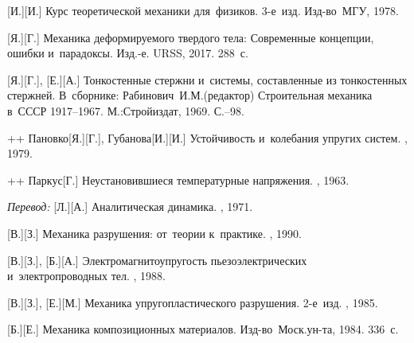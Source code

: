 \begin{thebibliography}{123}
\begin{otherlanguage}{russian}
[И.][И.] Курс теоретической механики для~физиков. 3\hbox{-}е~изд. Изд\hbox{-}во~МГУ, 1978. 

[Я.][Г.] Механика деформируемого твердого тела: Современные концепции, ошибки и~парадоксы. Изд.\hbox{-}е. URSS, 2017. 288~с.

[Я.][Г.], [Е.][А.] Тонкостенные стержни и~системы, составленные из тонкостенных стержней. В~сборнике: Рабинович~И.\:М.\:(редактор) Строительная механика в~СССР 1917\hbox{--}1967. М.:\;Строй\-издат, 1969. С.\hbox{--}98.

++ {Пановко}[Я.][Г.], {Губанова}[И.][И.] Устойчивость и~колебания упругих систем. \naukapublisher, 1979. 

++ {Паркус}[Г.] Неустановившиеся температурные напряжения. \fizmatgiz, 1963. 


\emph{Перевод:} [Л.][А.] Аналитическая динамика. \naukapublisher, 1971. 

[В.][З.] Механика разрушения: от~теории к~практике. \naukapublisher, 1990. 

[В.][З.], [Б.][А.] Электромагнитоупругость пьезоэлектрических и~электропроводных тел. \naukapublisher, 1988. 

[В.][З.], [Е.][М.] Механика упругопластического разрушения. 2\hbox{-}е~изд. \naukapublisher, 1985. 

[Б.][Е.] Механика композиционных материалов. Изд\hbox{-}во~Моск.\:ун\hbox{-}та, 1984. 336~с.


\end{otherlanguage}
\end{thebibliography}

